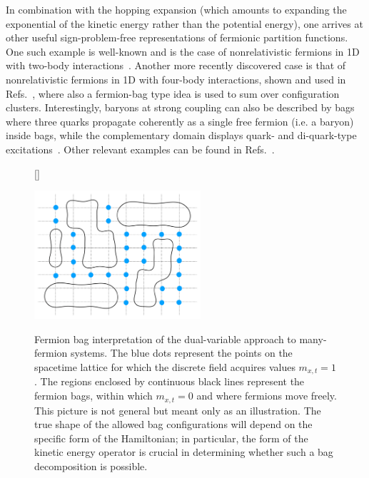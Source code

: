 \documentclass[../main.tex]{subfiles}
\begin{document}
In combination with the hopping expansion (which amounts to expanding the exponential of the
kinetic energy rather than the potential energy), one arrives at other useful sign-problem-free representations of fermionic partition functions. One such example is well-known and is the
case of nonrelativistic fermions in 1D with two-body interactions~\cite{PhysRevB.26.5033}. Another more recently discovered case is that of nonrelativistic fermions in 1D
with four-body interactions, shown and used in Refs.~\cite{PhysRevA.85.063624, PhysRevLett.109.250403, PhysRevA.87.063617}, where also a fermion-bag type idea is
used to sum over configuration clusters. Interestingly, baryons at strong coupling can also be described by bags where three quarks propagate coherently as a single free
fermion (i.e. a baryon) inside bags, while the complementary domain displays quark- and di-quark-type excitations~\cite{PhysRevD.97.074506}.
Other relevant examples can be found in Refs.~\cite{WOLFF2009549, PhysRevD.80.071503, PhysRevD.97.054501}.


\begin{figure}[t]
[\FBwidth]
{\caption{\label{fig:FermionBags} Fermion bag interpretation of the dual-variable approach to many-fermion systems. The blue dots represent the points on the
  spacetime lattice for which the discrete field acquires values $m_{x,t} = 1$. The regions enclosed by continuous black lines represent the fermion bags, within
  which $m_{x,t} = 0$ and where fermions move freely. This picture is not general but meant only as an illustration. The true shape of the allowed bag configurations will depend on the specific form of the Hamiltonian; in particular, the form of the kinetic energy operator is crucial in determining whether such a bag decomposition is possible.}}
{\includegraphics[width=0.55\textwidth]{./2generalformalism/FermionBags.pdf}}
\end{figure}
%
\newpage
\end{document}
